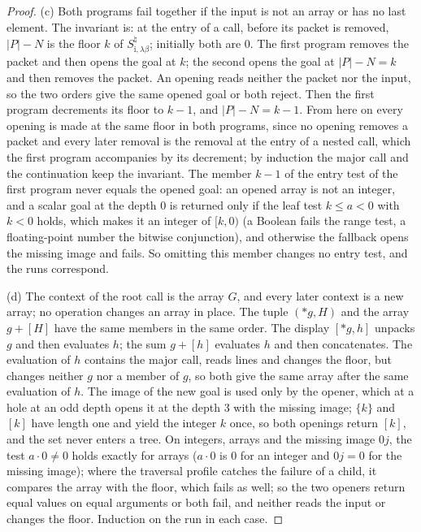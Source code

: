 \begin{proof}
(c) Both programs fail together if the input is not an array or has no last element. The
invariant is: at the entry of a call, before its packet is removed, $\lvert P\rvert-N$ is the floor
$k$ of $S^{\natural}_{\mathrm{i},\lambda\beta}$; initially both are $0$. The first program removes
the packet and then opens the goal at $k$; the second opens the goal at $\lvert P\rvert-N=k$ and then
removes the packet. An opening reads neither the packet nor the input, so the two orders give the
same opened goal or both reject. Then the first program decrements its floor to $k-1$, and
$\lvert P\rvert-N=k-1$. From here on every opening is made at the same floor in both programs, since
no opening removes a packet and every later removal is the removal at the entry of a nested call,
which the first program accompanies by its decrement; by induction the major call and the
continuation keep the invariant. The member $k-1$ of the entry test of the first program never
equals the opened goal: an opened array is not an integer, and a scalar goal at the depth $0$ is
returned only if the leaf test $k\le a<0$ with $k<0$ holds, which makes it an integer of $[k,0)$
(a Boolean fails the range test, a floating-point number the bitwise conjunction), and otherwise
the fallback opens the missing image and fails. So omitting this member changes no entry test, and
the runs correspond.

(d) The context of the root call is the array $G$, and every later context is a new array; no
operation changes an array in place. The tuple $({*}g,H)$ and the array $g+[H]$ have the same members
in the same order. The display $[{*}g,h]$ unpacks $g$ and then evaluates $h$; the sum $g+[h]$
evaluates $h$ and then concatenates. The evaluation of $h$ contains the major call, reads lines and
changes the floor, but changes neither $g$ nor a member of $g$, so both give the same array after
the same evaluation of $h$. The image of the new goal is used only by the opener, which at a hole at
an odd depth opens it at the depth $3$ with the missing image; $\{k\}$ and $[k]$ have length one and
yield the integer $k$ once, so both openings return $[k]$, and the set never enters a tree. On
integers, arrays and the missing image $0j$, the test $a\cdot 0\neq 0$ holds exactly for arrays
($a\cdot 0$ is $0$ for an integer and $0j=0$ for the missing image); where the traversal profile
catches the failure of a child, it compares the array with the floor, which fails as well; so the two
openers return equal values on equal arguments or both fail, and neither reads the input or changes
the floor. Induction on the run in each case.
\end{proof}

